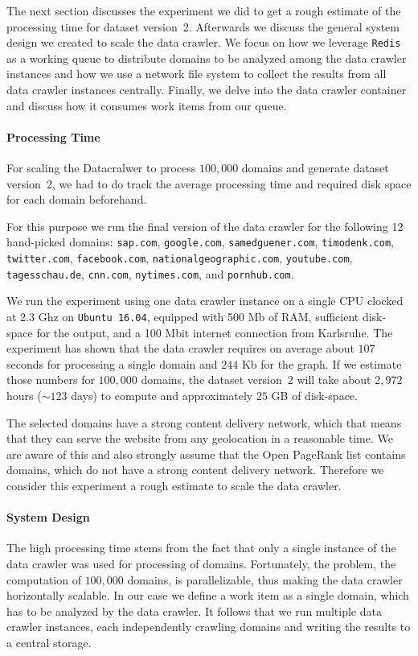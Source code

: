 The next section discusses the experiment we did to get a rough estimate of the processing time for dataset version~2. Afterwards we discuss the general system design we created to scale the data crawler. We focus on how we leverage \texttt{Redis} as a working queue to distribute domains to be analyzed among the data crawler instances and how we use a network file system to collect the results from all data crawler instances centrally. Finally, we delve into the data crawler container and discuss how it consumes work items from our queue.

\paragraph*{Processing Time}
\label{datacrawler_processing_time}
For scaling the Datacralwer to process $100,000$ domains and generate dataset version~2, we had to do track the average processing time and required disk space for each domain beforehand.

For this purpose we run the final version of the data crawler for the following 12 hand-picked domains: \texttt{sap.com}, \texttt{google.com}, \texttt{samedguener.com}, \texttt{timodenk.com}, \texttt{twitter.com}, \texttt{facebook.com}, \texttt{nationalgeographic.com}, \texttt{youtube.com}, \texttt{tagesschau.de}, \texttt{cnn.com}, \texttt{nytimes.com}, and \texttt{pornhub.com}.

We run the experiment using one data crawler instance on a single CPU clocked at $2.3$ Ghz on \texttt{Ubuntu 16.04}, equipped with 500 Mb of RAM, sufficient disk-space for the output, and a 100 Mbit internet connection from Karlsruhe. The experiment has shown that the data crawler requires on average about $107$ seconds for processing a single domain and $244$ Kb for the graph. If we estimate those numbers for $100,000$ domains, the dataset version~2 will take about $2,972$ hours ($\sim 123$ days) to compute and approximately $25$ GB of disk-space.

The selected domains have a strong content delivery network, which that means that they can serve the website from any geolocation in a reasonable time. We are aware of this and also strongly assume that the Open PageRank list contains domains, which do not have a strong content delivery network. Therefore we consider this experiment a rough estimate to scale the data crawler.

\paragraph*{System Design}
\label{datacrawler_scale_architecture}
The high processing time stems from the fact that only a single instance of the data crawler was used for processing of domains. Fortunately, the problem, the computation of $100,000$ domains, is parallelizable, thus making the data crawler horizontally scalable. In our case we define a work item as a single domain, which has to be analyzed by the data crawler. It follows that we run multiple data crawler instances, each independently crawling domains and writing the results to a central storage.

